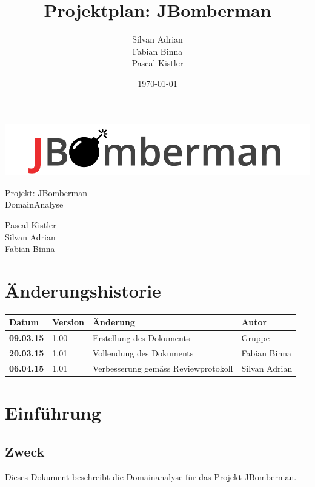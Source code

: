 \documentclass[11pt]{scrartcl}
\title{Projektplan: JBomberman}
\author{Silvan Adrian \\ Fabian Binna \\ Pascal Kistler}
\date{\today{}}
\begin{document}
\def\arraystretch{1.5}
\begin{titlepage}
\begin{center}
\vspace{10em}
\includegraphics[scale=2]{jbomberman}
\vspace{10em}
\end{center}
\begin{center}
\huge {Projekt: JBomberman} \\
\huge {DomainAnalyse}
\end{center}
\begin{center}
\vspace{10em}
\LARGE {Pascal Kistler} \\
\LARGE {Silvan Adrian} \\
\LARGE {Fabian Binna}
\end{center}

\end{titlepage}

\newpage
\section{Änderungshistorie}
\label{sec:Änderungen}

\begin{tabularx}{\linewidth}{l l l l}
\textbf{Datum} & \textbf{Version} & \textbf{Änderung}  & \textbf{Autor} \\
\hline
\textbf{09.03.15} & 1.00 & Erstellung des Dokuments & Gruppe \\
\textbf{20.03.15} & 1.01 & Vollendung des Dokuments & Fabian Binna \\
\textbf{06.04.15} & 1.01 & Verbesserung gemäss Reviewprotokoll & Silvan Adrian \\
\end{tabularx}

\newpage
\tableofcontents
\newpage
\section{Einführung}
\label{sec:Einführung}

\subsection{Zweck}
\label{sec:Zweck}
Dieses Dokument beschreibt die Domainanalyse für das Projekt JBomberman.
\end{document}
